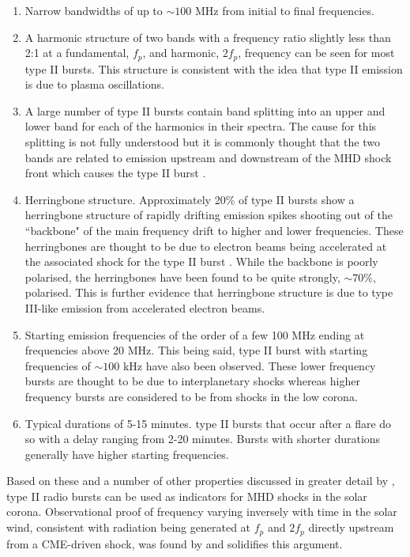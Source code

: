 \begin{enumerate}
    \item Narrow bandwidths of up to $\sim 100$ MHz from initial to final frequencies.
    \item A harmonic structure of two bands with a frequency ratio slightly less than 2:1 at a fundamental, $f_p$, and harmonic, $2f_p$, frequency can be seen for most type II bursts. This structure is consistent with the idea that type II emission is due to plasma oscillations.
    \item A large number of type II bursts contain band splitting into an upper and lower band for each of the harmonics in their spectra. The cause for this splitting is not fully understood but it is commonly thought that the two bands are related to emission upstream and downstream of the MHD shock front which causes the type II burst \citep{Smerd1974,NelsonandMelrose1985, Vrsnak2002}.
    \item Herringbone structure. Approximately 20\% of type II bursts show a herringbone structure of rapidly drifting emission spikes shooting out of the ``backbone" of the main frequency drift to higher and lower frequencies. These herringbones are thought to be due to electron beams being accelerated at the associated shock for the type II burst \citep{Mann1995}. While the backbone is poorly polarised, the herringbones have been found to be quite strongly, $\sim 70\%$, polarised. This is further evidence that herringbone structure is due to type III-like emission from accelerated electron beams.
    \item Starting emission frequencies of the order of a few 100 MHz ending at frequencies above 20 MHz. This being said, type II burst with starting frequencies of $\sim 100$ kHz have also been observed. 
    These lower frequency bursts are thought to be due to interplanetary shocks whereas higher frequency bursts are considered to be from shocks in the low corona.
    \item Typical durations of 5-15 minutes. type II bursts that occur after a flare do so with a delay ranging from 2-20 minutes. Bursts with shorter durations generally have higher starting frequencies. %
\end{enumerate}
 
Based on these and a number of other properties discussed in greater detail by \cite{NelsonandMelrose1985}, type II radio bursts can be used as indicators for MHD shocks in the solar corona. Observational proof of frequency varying inversely with time in the solar wind, consistent with radiation being generated at $f_p$ and $2f_p$ directly upstream from a CME-driven shock, was found by \cite{Reiner1997} and solidifies this argument.

